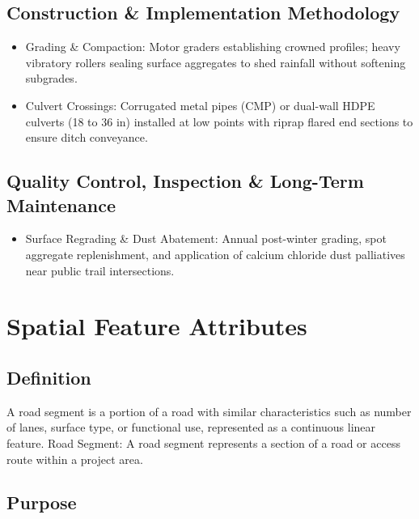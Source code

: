 \documentclass[
  letterpaper,
  DIV=11,
  numbers=noendperiod]{scrreprt}
\providecommand{\tightlist}{%
  \setlength{\itemsep}{0pt}\setlength{\parskip}{0pt}}
\begin{document}
\subsection{Construction \& Implementation
Methodology}\label{construction-implementation-methodology-21}

\begin{itemize}
\item
  Grading \& Compaction: Motor graders establishing crowned profiles;
  heavy vibratory rollers sealing surface aggregates to shed rainfall
  without softening subgrades.
\item
  Culvert Crossings: Corrugated metal pipes (CMP) or dual-wall HDPE
  culverts (18 to 36 in) installed at low points with riprap flared end
  sections to ensure ditch conveyance.
\end{itemize}

\subsection{Quality Control, Inspection \& Long-Term
Maintenance}\label{quality-control-inspection-long-term-maintenance-22}

\begin{itemize}
\tightlist
\item
  Surface Regrading \& Dust Abatement: Annual post-winter grading, spot
  aggregate replenishment, and application of calcium chloride dust
  palliatives near public trail intersections.
\end{itemize}

\section{Spatial Feature Attributes}\label{spatial-feature-attributes-6}

\subsection{Definition}\label{definition-22}

A road segment is a portion of a road with similar characteristics such
as number of lanes, surface type, or functional use, represented as a
continuous linear feature. Road Segment: A road segment represents a
section of a road or access route within a project area.

\subsection{Purpose}\label{purpose-26}
\end{document}
